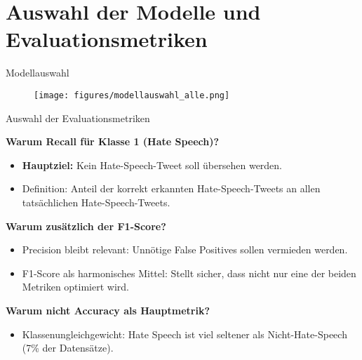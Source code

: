 \documentclass[aspectratio=169]{beamer} %
\begin{document}
\section{Auswahl der Modelle und Evaluationsmetriken}
\begin{frame}{Modellauswahl}
    \vspace{-0.5cm} %
    \begin{figure}
        \centering
        \texttt{[image: figures/modellauswahl\_alle.png]}
        \label{fig:yourimage}
    \end{figure}
\end{frame}


\begin{frame}{Auswahl der Evaluationsmetriken}

\textbf{Warum Recall für Klasse 1 (Hate Speech)?}
\begin{itemize}
    \item \textbf{Hauptziel:} Kein Hate-Speech-Tweet soll übersehen werden.
    \item Definition: Anteil der korrekt erkannten Hate-Speech-Tweets an allen tatsächlichen Hate-Speech-Tweets.
\end{itemize}

\textbf{Warum zusätzlich der F1-Score?}
\begin{itemize}
    \item Precision bleibt relevant: Unnötige False Positives sollen vermieden werden.
    \item F1-Score als harmonisches Mittel: Stellt sicher, dass nicht nur eine der beiden Metriken optimiert wird.
\end{itemize}

\textbf{Warum nicht Accuracy als Hauptmetrik?}
\begin{itemize}
    \item Klassenungleichgewicht: Hate Speech ist viel seltener als Nicht-Hate-Speech \\
    (7\% der Datensätze).
\end{itemize}

\end{frame}
\end{document}
